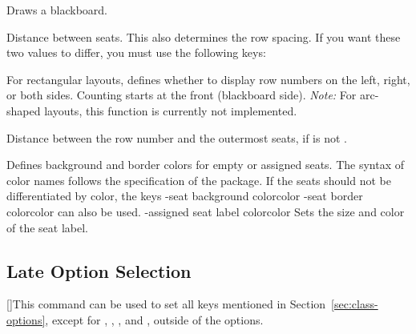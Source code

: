 \documentclass[
babel-options={english},
load-preamble-,
title=compact
]{cnltx-doc}
\begin{document}
\begin{options}
  Draws a blackboard.

  \Default{2pt}
  Distance between seats. This also determines the row spacing.
  If you want these two values to differ, you must use the following keys:

  \Default*{2pt}\vspace{-.3\baselineskip}
  \Default{2pt}

  For rectangular layouts, defines whether to display row numbers on the left, right, or both sides.
  Counting starts at the front (blackboard side).\newline
  \emph{Note:} For arc-shaped layouts, this function is currently not implemented.

  \Default{2pt}
  Distance between the row number and the outermost seats,
  if  is not .

  \vspace{-.3\baselineskip}
  \vspace{-.3\baselineskip}
  \vspace{-.3\baselineskip}
  Defines background and border colors for empty or assigned seats.
  The syntax of color names follows the specification of the 
  package.
  If the seats should not be differentiated by color, the keys
  \keyval-{seat background color}{color}\Default*\vspace{-.3\baselineskip}
  \keyval-{seat border color}{color}\Default
  can also be used.
  \vspace{-.3\baselineskip}
  \keyval-{assigned seat label color}{color}
  Sets the size and color of the seat label.
\end{options}

\subsection{Late Option Selection}
\label{sec:late-options}
\begin{commands}
  []This command can be used to set all keys mentioned in
  Section~\ref{sec:class-options}, except for
  , , , and ,
  outside of the  options.
\end{commands}
\end{document}
